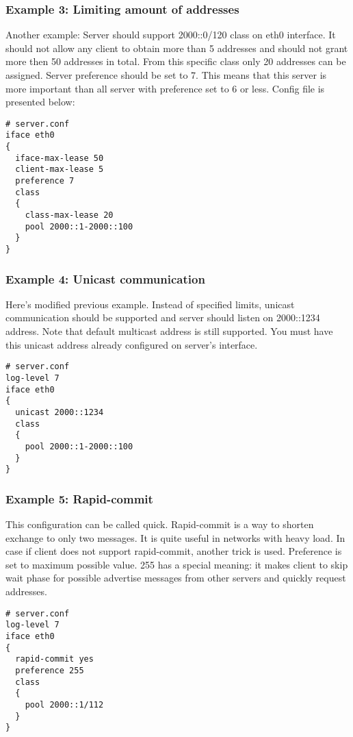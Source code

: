 \subsubsection{Example 3: Limiting amount of addresses}
Another example: Server should support 2000::0/120 class on eth0
interface. It should not allow any client to obtain more than 5
addresses and should not grant more then 50 addresses in total. From
this specific class only 20 addresses can be assigned. Server
preference should be set to 7. This means that this server is more
important than all server with preference set to 6 or less.
Config file is presented below:

\begin{lstlisting}
# server.conf
iface eth0
{
  iface-max-lease 50
  client-max-lease 5
  preference 7
  class
  {
    class-max-lease 20
    pool 2000::1-2000::100
  }
}
\end{lstlisting}

\subsubsection{Example 4: Unicast communication}
\label{example-server-unicast}

Here's modified previous example. Instead of specified limits, unicast
communication should be supported and server should listen on
2000::1234 address. Note that default multicast address is still
supported. You must have this unicast address already configured on
server's interface.

\begin{lstlisting}
# server.conf
log-level 7
iface eth0
{
  unicast 2000::1234
  class
  {
    pool 2000::1-2000::100
  }
}
\end{lstlisting}

\subsubsection{Example 5: Rapid-commit}
This configuration can be called quick. Rapid-commit is a way to shorten exchange to only two messages. It is
quite useful in networks with heavy load. In case if client does not
support rapid-commit, another trick is used. Preference is set to
maximum possible value. 255 has a special meaning: it makes client to
skip wait phase for possible advertise messages from other servers and
quickly request addresses.

\begin{lstlisting}
# server.conf
log-level 7
iface eth0
{
  rapid-commit yes
  preference 255
  class
  {
    pool 2000::1/112
  }
}
\end{lstlisting}

